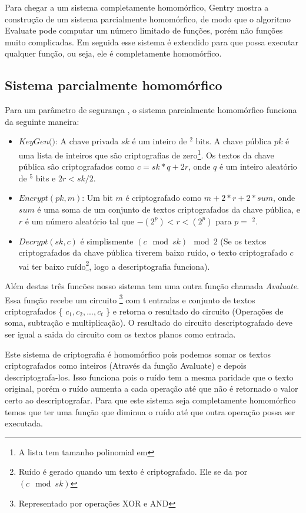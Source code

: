Para chegar a um sistema completamente homomórfico, Gentry mostra a construção de um sistema parcialmente homomórfico, de modo que o algoritmo Evaluate pode computar um número limitado de funções, porém não funções muito complicadas. Em seguida esse sistema é extendido para que possa executar qualquer função, ou seja, ele é completamente homomórfico.

\subsection{Sistema parcialmente homomórfico}
Para um parâmetro de segurança \textlambda, o sistema parcialmente homomórfico funciona da seguinte maneira:
\begin{itemize}
	\item \(KeyGen(\)\textlambda\()\): A chave privada \(sk\) é um inteiro de \textlambda \(^2\)  bits. A chave pública \(pk\) é uma lista de inteiros que são criptografias de zero\footnote{A lista tem tamanho polinomial em \textlambda}. Os textos da chave pública são criptografados como \(c = sk*q + 2r\), onde \(q\) é um inteiro aleatório de \textlambda \(^5\) bits e \( 2r < sk/2 \).
	\item \(Encrypt(pk,m)\): Um bit \(m\) é criptografado como \(m + 2*r + 2*sum\), onde \(sum\) é uma soma de um conjunto de textos criptografados da chave pública, e \( r \) é um número aleatório tal que \( -(2^p) < r < (2^p) \) para \( p = \) \textlambda  \(^2 \).
	\item \(Decrypt(sk,c)\) é simplismente \((c \mod sk) \mod 2\) (Se os textos criptografados da chave pública tiverem baixo ruído, o texto criptografado \(c\) vai ter baixo ruído\footnote{Ruído é gerado quando um texto é criptografado. Ele se da por \((c \mod sk)\)}, logo a descriptografia funciona).
\end{itemize}
Além destas três funcões nosso sistema tem uma outra função chamada \textit{Avaluate}. Essa função recebe um circuito \footnote{Representado por operações XOR e AND} com t entradas e conjunto de textos criptografados \{ \( c_1,c_2,...,c_t \) \} e retorna o resultado do circuito (Operações de soma, subtração e multiplicação). O resultado do circuito descriptografado deve ser igual a saida do circuito com os textos planos como entrada.

Este sistema de criptografia é homomórfico pois podemos somar os textos criptografados como inteiros (Através da função Avaluate) e depois descriptografa-los. Isso funciona pois o ruído tem a mesma paridade que o texto original, porém o ruído aumenta a cada operação até que não é retornado o valor certo ao descriptografar.
Para que este sistema seja completamente homomórfico temos que ter uma função que diminua o ruído até que outra operação possa ser executada.

